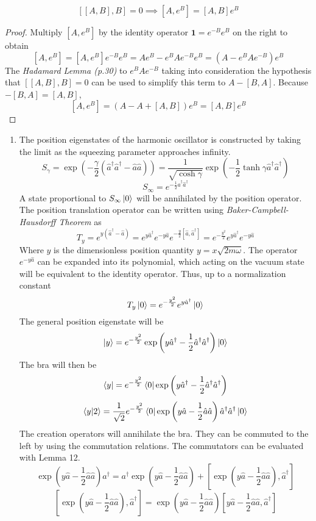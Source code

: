 \begin{sol}
\begin{lemma}
$$[[A,B],B]=0\implies[A,e^B]=[A,B]e^B$$
\end{lemma}
\begin{proof}
Multiply $[A,e^B]$ by the identity operator $\mathbf 1=e^{-B}e^B$ on the right to obtain
$$[A,e^B]=[A,e^B]e^{-B}e^B=Ae^B-e^BAe^{-B}e^B=(A-e^BAe^{-B})e^B$$ 
The \textit{Hadamard Lemma (p.30)} to $e^BAe^{-B}$ taking into consideration the hypothesis that $[[A,B],B]=0$ can be used to simplify this term to $A-[B,A]$. Because $-[B,A]=[A,B]$, 
$$[A,e^B]=(A-A+[A,B])e^B=[A,B]e^B$$


\end{proof}
\begin{enumerate}[label=\textbf{(\alph*)}]
    \item 
    The position eigenstates of the harmonic oscillator is constructed by taking the limit as the squeezing parameter approaches infinity. 
    $$S_\gamma = \exp\left(-\frac{\gamma}{2}(\hat a^\dagger\hat a^\dagger-\hat a\hat a)\right)=\frac{1}{\sqrt{\cosh\gamma}}\exp\left(-\frac{1}{2}\tanh\gamma\hat a^\dagger\hat a^\dagger\right)$$
    $$S_\infty=e^{-\frac{1}{2}\hat a^\dagger\hat a^\dagger}$$
    A state proportional to $S_\infty\ket 0$ will be annihilated by the position operator.\\
    The position translation operator can be written using \textit{Baker-Campbell-Hausdorff Theorem} as
    $$T_y = e^{y(\hat a^\dagger-\hat a)}=e^{y\hat a^\dagger}e^{-y\hat a}e^{-\frac{y}{2}[\hat a, \hat a^\dagger]}=e^{-\frac{y^2}{2}}e^{y\hat a^\dagger}e^{-y\hat a}$$ 
    Where $y$ is the dimensionless position quantity $y= x\sqrt{2m\omega}$. The operator $e^{-y\hat a}$ can be expanded into its polynomial, which acting on the vacuum state will be equivalent to the identity operator. Thus, up to a normalization constant
    $$T_y\ket 0=e^{-\frac{y^2}{2}}e^{y\hat a^\dagger}\ket 0$$
    The general position eigenstate will be
    $$\ket y = e^{-\frac{y^2}{2}}\exp\left(y\hat a^\dagger-\frac{1}{2}\hat a^\dagger\hat a^\dagger\right)\ket 0$$
    The bra will then be 
    $$\bra y =  e^{-\frac{y^2}{2}}\bra 0\exp\left(y\hat a^\dagger-\frac{1}{2}\hat a^\dagger\hat a^\dagger\right)$$ $$\braket{y}{2}=\frac{1}{\sqrt 2}e^{-\frac{y^2}{2}}\bra 0\exp\left(y\hat a-\frac{1}{2}\hat a\hat a\right)\hat a^\dagger\hat a^\dagger\ket 0$$
    The creation operators will annihilate the bra. They can be commuted to the left by using the commutation relations. The commutators can be evaluated with Lemma 12.
    $$\exp\left(y\hat a-\frac{1}{2}\hat a\hat a\right)a^\dagger =a^\dagger\exp\left(y\hat a-\frac{1}{2}\hat a\hat a\right)+\left[\exp\left(y\hat a-\frac{1}{2}\hat a\hat a\right),\hat a^\dagger\right]$$ $$\left[\exp\left(y\hat a-\frac{1}{2}\hat a\hat a\right),\hat a^\dagger\right]=\exp\left(y\hat a-\frac{1}{2}\hat a\hat a\right)\left[y\hat a-\frac{1}{2}\hat a\hat a,\hat a^\dagger\right]$$

\end{enumerate}
\end{sol}

